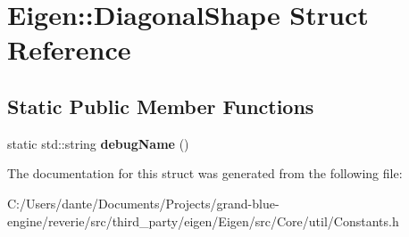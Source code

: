\hypertarget{struct_eigen_1_1_diagonal_shape}{}\section{Eigen\+::Diagonal\+Shape Struct Reference}
\label{struct_eigen_1_1_diagonal_shape}
\subsection*{Static Public Member Functions}
\begin{DoxyCompactItemize}
\item 
\mbox{\label{struct_eigen_1_1_diagonal_shape_a8de4e0b884709c83e6411719b95da29a}} 
static std\+::string {\bfseries debug\+Name} ()
\end{DoxyCompactItemize}


The documentation for this struct was generated from the following file\+:\begin{DoxyCompactItemize}
\item 
C\+:/\+Users/dante/\+Documents/\+Projects/grand-\/blue-\/engine/reverie/src/third\+\_\+party/eigen/\+Eigen/src/\+Core/util/Constants.\+h\end{DoxyCompactItemize}

